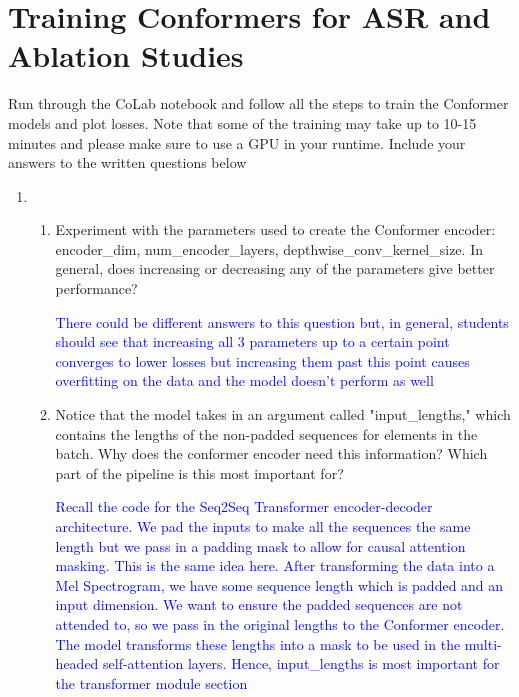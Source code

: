 \documentclass{article}
\begin{document}
\section{Training Conformers for ASR and Ablation Studies}
Run through the CoLab notebook \href{https://colab.research.google.com/drive/1h_ML3mGcVd3opaa2ctxL3ZnuI2LV1uyz?usp=sharing}{\color{blue}{Conformers\_ASR.ipynb}} and follow all the steps to train the Conformer models and plot losses. Note that some of the training may take up to 10-15 minutes and please make sure to use a GPU in your runtime. Include your answers to the written questions below
\newline
\begin{enumerate}[label=(\alph*)]
\item\mbox{}\\
\begin{enumerate}[label=(\roman*)]
    \item Experiment with the parameters used to create the Conformer encoder: \newline encoder\_dim, num\_encoder\_layers, depthwise\_conv\_kernel\_size. In general, does increasing or decreasing any of the parameters give better performance?

    \textcolor{blue}{There could be different answers to this question but, in general, students should see that increasing all 3 parameters up to a certain point converges to lower losses but increasing them past this point causes overfitting on the data and the model doesn't perform as well}

    \item Notice that the model takes in an argument called "input\_lengths," which contains the lengths of the non-padded sequences for elements in the batch. Why does the conformer encoder need this information? Which part of the pipeline is this most important for?

    \textcolor{blue}{Recall the code for the Seq2Seq Transformer encoder-decoder architecture. We pad the inputs to make all the sequences the same length but we pass in a padding mask to allow for causal attention masking. This is the same idea here. After transforming the data into a Mel Spectrogram, we have some sequence length which is padded and an input dimension. We want to ensure the padded sequences are not attended to, so we pass in the original lengths to the Conformer encoder. The model transforms these lengths into a mask to be used in the multi-headed self-attention layers. Hence, input\_lengths is most important for the transformer module section}
    

\end{enumerate}
\end{enumerate}
\end{document}
